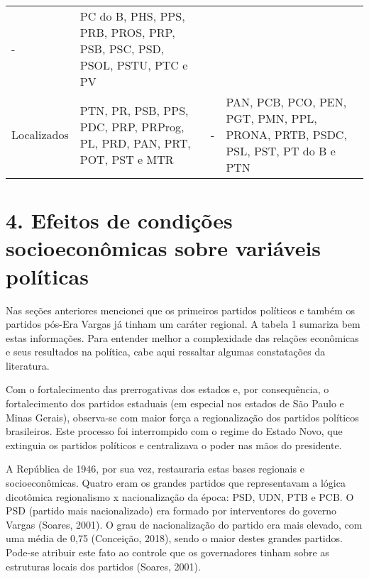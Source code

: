 \documentclass[]{article}
\begin{document}
\begin{longtable}[]{@{}llll@{}}
\begin{minipage}[t]{0.15\columnwidth}
-\strut
\end{minipage} & \begin{minipage}[t]{0.14\columnwidth}\raggedright\strut
PC do B, PHS, PPS, PRB, PROS, PRP, PSB, PSC, PSD, PSOL, PSTU, PTC e
PV\strut
\end{minipage}\tabularnewline
\begin{minipage}[t]{0.09\columnwidth}\raggedright\strut
Localizados\strut
\end{minipage} & \begin{minipage}[t]{0.15\columnwidth}\raggedright\strut
PTN, PR, PSB, PPS, PDC, PRP, PRProg, PL, PRD, PAN, PRT, POT, PST e
MTR\strut
\end{minipage} & \begin{minipage}[t]{0.15\columnwidth}\raggedright\strut
-\strut
\end{minipage} & \begin{minipage}[t]{0.14\columnwidth}\raggedright\strut
PAN, PCB, PCO, PEN, PGT, PMN, PPL, PRONA, PRTB, PSDC, PSL, PST, PT do B
e PTN\strut
\end{minipage}\tabularnewline
\bottomrule
\end{longtable}

\section{4. Efeitos de condições socioeconômicas sobre variáveis
políticas}\label{efeitos-de-condicoes-socioeconomicas-sobre-variaveis-politicas}

Nas seções anteriores mencionei que os primeiros partidos políticos e
também os partidos pós-Era Vargas já tinham um caráter regional. A
tabela 1 sumariza bem estas informações. Para entender melhor a
complexidade das relações econômicas e seus resultados na política, cabe
aqui ressaltar algumas constatações da literatura.

Com o fortalecimento das prerrogativas dos estados e, por consequência,
o fortalecimento dos partidos estaduais (em especial nos estados de São
Paulo e Minas Gerais), observa-se com maior força a regionalização dos
partidos políticos brasileiros. Este processo foi interrompido com o
regime do Estado Novo, que extinguia os partidos políticos e
centralizava o poder nas mãos do presidente.

A República de 1946, por sua vez, restauraria estas bases regionais e
socioeconômicas. Quatro eram os grandes partidos que representavam a
lógica dicotômica regionalismo x nacionalização da época: PSD, UDN, PTB
e PCB. O PSD (partido mais nacionalizado) era formado por interventores
do governo Vargas (Soares, 2001). O grau de nacionalização do partido
era mais elevado, com uma média de 0,75 (Conceição, 2018), sendo o maior
destes grandes partidos. Pode-se atribuir este fato ao controle que os
governadores tinham sobre as estruturas locais dos partidos (Soares,
2001).
\end{document}

